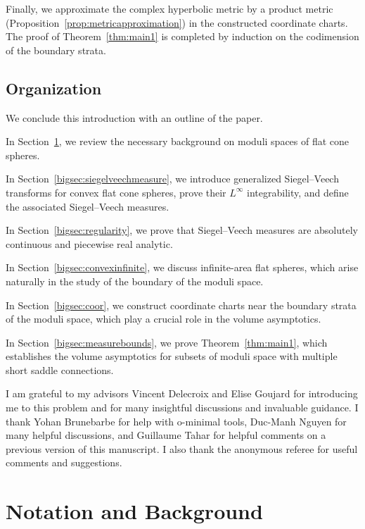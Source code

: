 \documentclass{compositio}
\numberwithin{equation}{section}
\numberwithin{figure}{section}
\theoremstyle{definition}
\theoremstyle{plain}
\begin{document}
{Finally, we approximate the complex hyperbolic metric by a product metric (Proposition~\ref{prop:metricapproximation}) in the constructed coordinate charts. The proof of Theorem~\ref{thm:main1} is completed by induction on the codimension of the boundary strata.


\subsection{Organization}

We conclude this introduction with an outline of the paper.

In Section~\ref{bigsec:moduli}, we review the necessary background on moduli spaces of flat cone spheres.  

In Section~\ref{bigsec:siegelveechmeasure}, we introduce generalized Siegel--Veech transforms for convex flat cone spheres, prove their $L^\infty$ integrability, and define the associated Siegel--Veech measures.  

In Section~\ref{bigsec:regularity}, we prove that Siegel--Veech measures are absolutely continuous and piecewise real analytic.  

In Section~\ref{bigsec:convexinfinite}, we discuss infinite-area flat spheres, which arise naturally in the study of the boundary of the moduli space.  

In Section~\ref{bigsec:coor}, we construct coordinate charts near the boundary strata of the moduli space, which play a crucial role in the volume asymptotics.  

In Section~\ref{bigsec:measurebounds}, we prove Theorem~\ref{thm:main1}, which establishes the volume asymptotics for subsets of moduli space with multiple short saddle connections.  

\begin{acknowledgements}
I am grateful to my advisors Vincent Delecroix and Elise Goujard for introducing me to this problem and for many insightful discussions and invaluable guidance. I thank Yohan Brunebarbe for help with o-minimal tools, Duc-Manh Nguyen for many helpful discussions, and Guillaume Tahar for helpful comments on a previous version of this manuscript. I also thank the anonymous referee for useful comments and suggestions.
\end{acknowledgements}

\section{Notation and Background}\label{bigsec:moduli}

}
\end{document}
